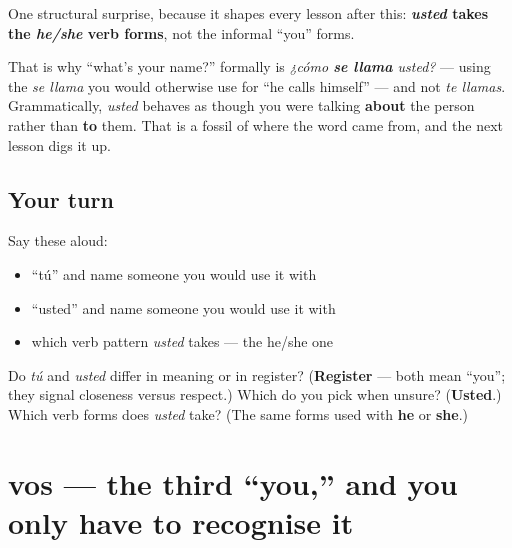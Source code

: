 \begin{grammarlens}[title={Grammar Lens: usted takes he/she forms}]
One structural surprise, because it shapes every lesson after this: \textbf{\emph{usted} takes the \emph{he/she} verb forms}, not the informal \textquotedblleft{}you\textquotedblright{} forms.

That is why \textquotedblleft{}what's your name?\textquotedblright{} formally is \emph{¿cómo \textbf{se llama} usted?} — using the \emph{se llama} you would otherwise use for \textquotedblleft{}he calls himself\textquotedblright{} — and not \emph{te llamas}. Grammatically, \emph{usted} behaves as though you were talking \textbf{about} the person rather than \textbf{to} them. That is a fossil of where the word came from, and the next lesson digs it up.
\end{grammarlens}

\subsection*{Your turn}
Say these aloud:

\begin{itemize}
\raggedright
  \item \textquotedblleft{}tú\textquotedblright{} and name someone you would use it with
  \item \textquotedblleft{}usted\textquotedblright{} and name someone you would use it with
  \item which verb pattern \emph{usted} takes — the he/she one
\end{itemize}

\begin{tcolorbox}[breakable,colback=teal!4,colframe=teal!35!black,title={Before you move on}]
Do \emph{tú} and \emph{usted} differ in meaning or in register? (\textbf{Register} — both mean \textquotedblleft{}you\textquotedblright{}; they signal closeness versus respect.) Which do you pick when unsure? (\textbf{Usted}.) Which verb forms does \emph{usted} take? (The same forms used with \textbf{he} or \textbf{she}.)
\end{tcolorbox}
\section[vos]{vos — the third \textquotedblleft{}you,\textquotedblright{} and you only have to recognise it}

\label{lesson:ES-C03-vos}




